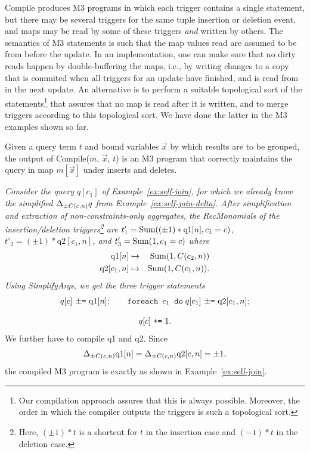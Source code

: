 Compile produces M3 programs in which each trigger contains a single statement,
but there may be several triggers for the same tuple insertion or deletion
event, and maps may be read by some of these triggers
{\em and}\/ written by others.
The semantics of M3 statements
is such that the map values read are assumed to be from
before the update. In an implementation, one can make sure that no dirty
reads happen by double-buffering the maps, i.e., by writing changes to
a copy that is commited when all triggers for an update have finished, and
is read from in the next update.
An alternative is to perform a suitable topological sort of
the statements\footnote{Our compilation approach assures that this is always
possible. Moreover, the order in which the compiler outputs the triggers
is such a topological sort.}
that assures that no map is read after it is written, 
and to merge triggers according to this topological sort.
We have done the latter in the M3 examples shown so far.


\begin{theorem}
Given a query term $t$ and bound variables $\vec{x}$ by which results
are to be grouped,
the output of Compile($m$, $\vec{x}$, $t$) is an M3 program that
correctly maintains the query in map $m[\vec{x}]$ under inserts and deletes.
\end{theorem}



\begin{example}\em
\label{ex:self-join-compile}
Consider the query $q[c_1]$ of
Example~\ref{ex:self-join}, for which we already know
the simplified $\Delta_{\pm C(c,n)} q$ from Example~\ref{ex:self-join-delta}.
After simplification and extraction of non-constraints-only aggregates,
the RecMonomials of the insertion/deletion triggers\footnote{Here,
$(\pm 1) * t$ is a shortcut for $t$ in the insertion case and
$(-1)*t$ in the deletion case.} are
$t'_1 = \mbox{Sum}((\pm 1) * \mbox{q1}[n], c_1=c)$,
$t'_2 = (\pm 1) * \mbox{q2}[c_1, n]$, and
$t'_3 = \mbox{Sum}(1, c_1=c)$
where
\begin{eqnarray*}
\mbox{q1}[n] &\mapsto& \mbox{Sum}(1, C(c_2, n)) \\
\mbox{q2}[c_1, n] &\mapsto& \mbox{Sum}(1, C(c_1,n)).
\end{eqnarray*}
Using SimplifyArgs, we get the three trigger statements
\[
q[c] \mbox{ {\tt $\pm$=} q1}[n]; \quad\quad
\mbox{{\tt foreach $c_1$ do}} \; q[c_1] \mbox{ {\tt $\pm$=} q2}[c_1, n];
\]

\vspace{-6mm}

\[
q[c] \mbox{ {\tt +=} } 1.
\]
We further have to compile q1 and q2. Since
\[
\Delta_{\pm C(c,n)} \mbox{q1}[n] = \Delta_{\pm C(c,n)} \mbox{q2}[c,n] = \pm 1,
\]
the compiled M3 program is exactly as shown in Example~\ref{ex:self-join}.
\punto
\end{example}


